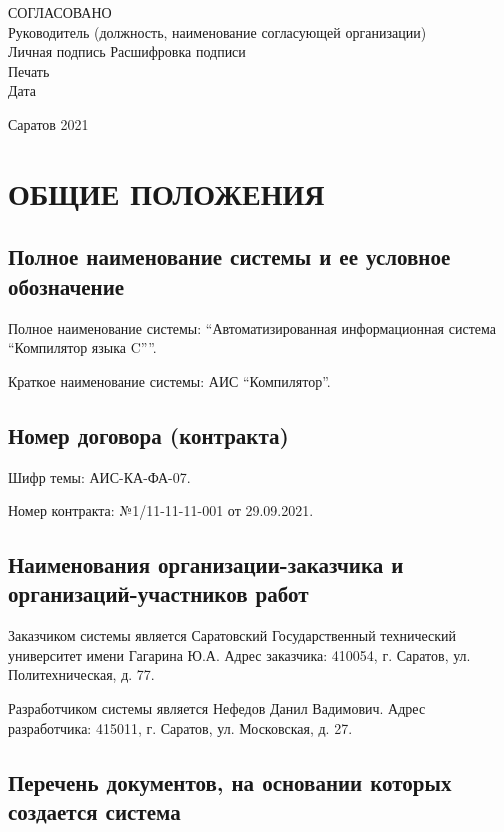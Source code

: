 \documentclass[14pt,russian]{extarticle}
\begin{document}
\bigskip
\bigskip

\begin{flushleft}
	СОГЛАСОВАНО \\
	Руководитель (должность, наименование согласующей организации) \\
	Личная подпись Расшифровка подписи \\
	Печать \\
	Дата \\
\end{flushleft}

\vfill

\begin{center}
	Саратов 2021
\end{center}

\clearpage
\section{ОБЩИЕ ПОЛОЖЕНИЯ}

\subsection{Полное наименование системы и ее условное обозначение}

Полное наименование системы: \enquote{Автоматизированная информационная система “Компилятор языка C”}.

Краткое наименование системы: АИС \enquote{Компилятор}.

\subsection{Номер договора (контракта)}

Шифр темы: АИС-КА-ФА-07.

Номер контракта: №1/11-11-11-001 от 29.09.2021.

\subsection{Наименования организации-заказчика и\\организаций-участников работ}

Заказчиком системы является Саратовский Государственный технический университет
имени Гагарина Ю.А. Адрес заказчика: 410054, г. Саратов, ул. Политехническая, д.
77.

Разработчиком системы является Нефедов Данил Вадимович. Адрес разработчика:
415011, г. Саратов, ул. Московская, д. 27.

\subsection{Перечень документов, на основании которых создается система}
\end{document}
